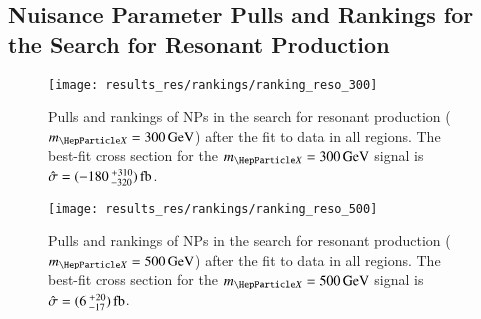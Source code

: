 
%   


\clearpage
\subsection{Nuisance Parameter Pulls and Rankings for the Search for Resonant
  \HH Production}%
\label{app:rankings_resonant}



\begin{figure}[htbp]
  \centering

  \texttt{[image: results\_res/rankings/ranking\_reso\_300]}

  \caption{Pulls and rankings of NPs in the search for resonant \HH production
    ($\mX = \SI{300}{\GeV}$) after the fit to data in all regions. The best-fit
    cross section for the $\mX = \SI{300}{\GeV}$ signal is
    $\hat{\sigma} =
    (\num{-180}\valuesep^{\hspace{0.25pt}+\hspace{0.25pt}310}_{-320})\valuesep\si{\femto\barn}$.}%
  \label{fig:ranking_pulls_mx300}
\end{figure}


\begin{figure}[htbp]
  \centering

  \texttt{[image: results\_res/rankings/ranking\_reso\_500]}


  \caption{Pulls and rankings of NPs in the search for resonant \HH production
    ($\mX = \SI{500}{\GeV}$) after the fit to data in all regions. The best-fit
    cross section for the $\mX = \SI{500}{\GeV}$ signal is
    $\hat{\sigma} =
    (\num{6}\valuesep^{\hspace{0.25pt}+\hspace{0.25pt}20}_{-17})\valuesep\si{\femto\barn}$.}%
  \label{fig:ranking_pulls_mx500}
\end{figure}


